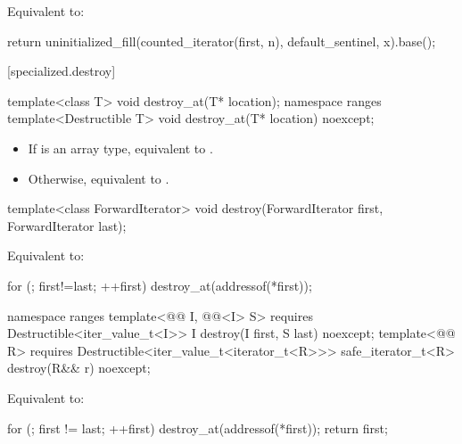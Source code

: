 \begin{itemdescr}
\pnum
\effects Equivalent to:
\begin{codeblock}
return uninitialized_fill(counted_iterator(first, n), default_sentinel, x).base();
\end{codeblock}
\end{itemdescr}

[specialized.destroy]{}

%
\begin{itemdecl}
template<class T>
  void destroy_at(T* location);
namespace ranges {
  template<Destructible T>
    void destroy_at(T* location) noexcept;
}
\end{itemdecl}

\begin{itemdescr}
\pnum
\effects
\begin{itemize}
\item If  is an array type, equivalent to
  .
\item Otherwise, equivalent to
  .
\end{itemize}
\end{itemdescr}

%
\begin{itemdecl}
template<class ForwardIterator>
  void destroy(ForwardIterator first, ForwardIterator last);
\end{itemdecl}

\begin{itemdescr}
\pnum
\effects
Equivalent to:
\begin{codeblock}
for (; first!=last; ++first)
  destroy_at(addressof(*first));
\end{codeblock}
\end{itemdescr}

%
\begin{itemdecl}
namespace ranges {
  template<@@ I, @@<I> S>
      requires Destructible<iter_value_t<I>>
    I destroy(I first, S last) noexcept;
  template<@@ R>
      requires Destructible<iter_value_t<iterator_t<R>>>
    safe_iterator_t<R> destroy(R&& r) noexcept;
}
\end{itemdecl}

\begin{itemdescr}
\pnum
\effects Equivalent to:
\begin{codeblock}
for (; first != last; ++first)
  destroy_at(addressof(*first));
return first;
\end{codeblock}
\end{itemdescr}

